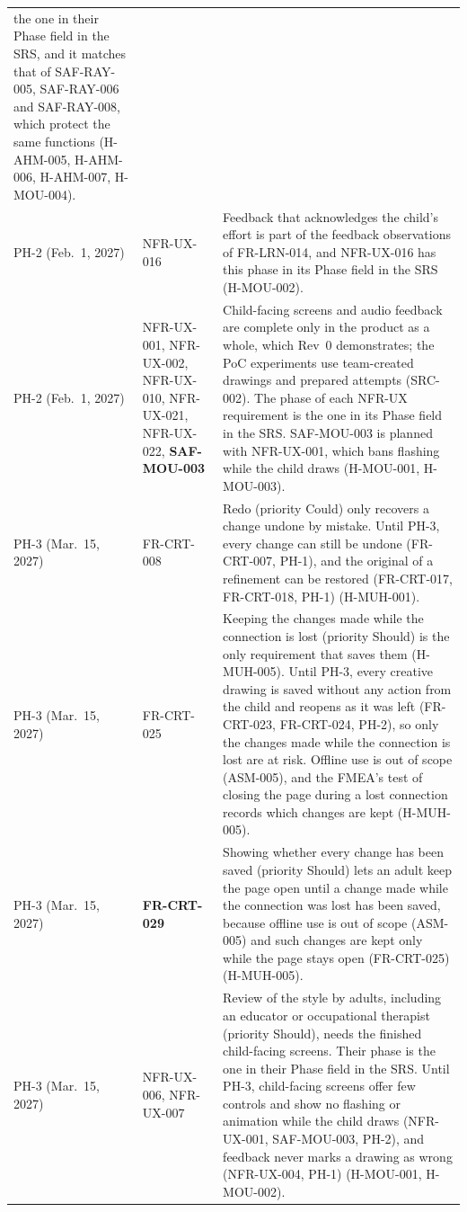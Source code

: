 \documentclass{article}
\begin{document}
{\begin{longtable}{@{}
  >{\raggedright\arraybackslash}p{1.7cm} >{\raggedright\arraybackslash}p{2.4cm}
  >{\raggedright\arraybackslash}p{\dimexpr\linewidth-4.1cm-4\tabcolsep\relax}
  @{}}
the one in their Phase field in the SRS, and it matches that of SAF-RAY-005,
SAF-RAY-006 and SAF-RAY-008, which protect the same functions (H-AHM-005,
H-AHM-006, H-AHM-007, H-MOU-004). \\
\addlinespace
PH-2 (Feb.~1, 2027) & NFR-UX-016 & Feedback that acknowledges the child's
effort is part of the feedback observations of FR-LRN-014, and NFR-UX-016 has
this phase in its Phase field in the SRS (H-MOU-002).
\\
\addlinespace
PH-2 (Feb.~1, 2027) & NFR-UX-001, NFR-UX-002, NFR-UX-010, NFR-UX-021,
NFR-UX-022, \textbf{SAF-MOU-003} & Child-facing screens and audio feedback are complete
only in the product as a whole, which Rev~0 demonstrates; the PoC experiments
use team-created drawings and prepared attempts (SRC-002). The phase of each
NFR-UX requirement is the one in its Phase field in the SRS. SAF-MOU-003 is
planned with NFR-UX-001, which bans flashing while the child draws (H-MOU-001,
H-MOU-003). \\
\midrule
PH-3 (Mar.~15, 2027) & FR-CRT-008 & Redo (priority Could) only recovers a change
undone by mistake. Until PH-3, every change can still be undone (FR-CRT-007,
PH-1), and the original of a refinement can be restored (FR-CRT-017, FR-CRT-018,
PH-1) (H-MUH-001). \\
\addlinespace
PH-3 (Mar.~15, 2027) & FR-CRT-025 & Keeping the changes made while the
connection is lost (priority Should) is the only requirement that saves them
(H-MUH-005). Until PH-3, every creative drawing is saved without any action from
the child and reopens as it was left (FR-CRT-023, FR-CRT-024, PH-2), so only the
changes made while the connection is lost are at risk. Offline use is out of
scope (ASM-005), and the FMEA's test of closing the page during a lost
connection records which changes are kept (H-MUH-005). \\
\addlinespace
PH-3 (Mar.~15, 2027) & \textbf{FR-CRT-029} & Showing whether every change has been saved
(priority Should) lets an adult keep the page open until a change made while the
connection was lost has been saved, because offline use is out of scope
(ASM-005) and such changes are kept only while the page stays open (FR-CRT-025)
(H-MUH-005). \\
\addlinespace
PH-3 (Mar.~15, 2027) & NFR-UX-006, NFR-UX-007 & Review of the style by adults,
including an educator or occupational therapist (priority Should), needs the
finished child-facing screens. Their phase is the one in their Phase field in
the SRS. Until PH-3, child-facing screens offer few controls and show no
flashing or animation while the child draws (NFR-UX-001, SAF-MOU-003, PH-2), and
feedback never marks a drawing as wrong (NFR-UX-004, PH-1) (H-MOU-001,
H-MOU-002). \\
\end{longtable}
}
\end{document}
